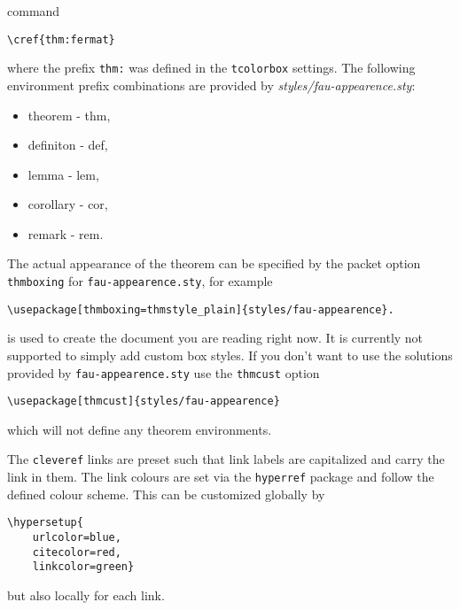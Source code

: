 command
\begin{lstlisting}[language={[LaTeX]TeX}]
\cref{thm:fermat}
\end{lstlisting}
where the prefix \texttt{thm:} was defined in the \texttt{tcolorbox} settings. The following 
environment prefix combinations are provided by \textit{styles/fau-appearence.sty}: 
\begin{itemize}
\item theorem - thm,
\item definiton - def,
\item lemma - lem,
\item corollary - cor,
\item remark - rem.
\end{itemize}
The actual appearance of the theorem can be specified by the packet option \texttt{thmboxing} 
for \texttt{fau-appearence.sty}, for example
\begin{lstlisting}[language={[LaTeX]TeX}]
\usepackage[thmboxing=thmstyle_plain]{styles/fau-appearence}.
\end{lstlisting}
is used to create the document you are reading right now.
It is currently not supported to simply add custom box styles. If you don't want to use the 
solutions provided by \texttt{fau-appearence.sty} use the \texttt{thmcust} option 
\begin{lstlisting}[language={[LaTeX]TeX}]
\usepackage[thmcust]{styles/fau-appearence}
\end{lstlisting}
which will not define any theorem environments.\par
The \texttt{cleveref} links are preset such that link labels are capitalized and carry 
the link in them. The link colours are set via the \texttt{hyperref} package and follow the 
defined colour scheme. This can be customized globally by 
\begin{lstlisting}[language={[LaTeX]TeX}]
\hypersetup{
	urlcolor=blue,
	citecolor=red,
	linkcolor=green}
\end{lstlisting}
but also locally for each link.
